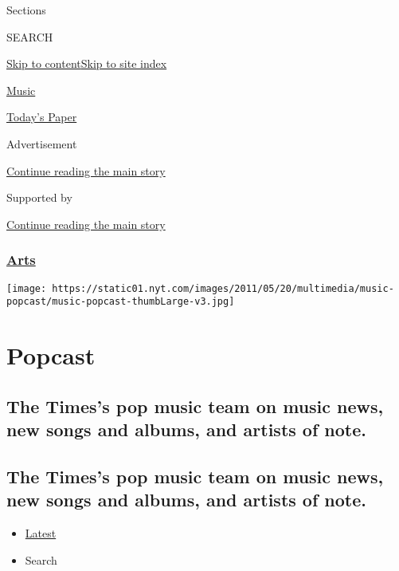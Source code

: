 Sections

SEARCH

\protect\hyperlink{site-content}{Skip to
content}\protect\hyperlink{site-index}{Skip to site index}

\href{https://www.nytimes.com/section/arts/music}{Music}

\href{https://myaccount.nytimes.com/auth/login?response_type=cookie\&client_id=vi}{}

\href{https://www.nytimes.com/section/todayspaper}{Today's Paper}

Advertisement

\protect\hyperlink{after-top}{Continue reading the main story}

Supported by

\protect\hyperlink{after-sponsor}{Continue reading the main story}

\hypertarget{arts}{%
\subsubsection{\texorpdfstring{\href{/section/arts}{Arts}}{Arts}}\label{arts}}

\texttt{[image: https://static01.nyt.com/images/2011/05/20/multimedia/music-popcast/music-popcast-thumbLarge-v3.jpg]}

\hypertarget{popcast}{%
\section{Popcast}\label{popcast}}

\hypertarget{the-timess-pop-music-team-on-music-news-new-songs-and-albums-and-artists-of-note}{%
\subsection{The Times's pop music team on music news, new songs and
albums, and artists of
note.}\label{the-timess-pop-music-team-on-music-news-new-songs-and-albums-and-artists-of-note}}

\hypertarget{the-timess-pop-music-team-on-music-news-new-songs-and-albums-and-artists-of-note-1}{%
\subsection{The Times's pop music team on music news, new songs and
albums, and artists of
note.}\label{the-timess-pop-music-team-on-music-news-new-songs-and-albums-and-artists-of-note-1}}

\begin{itemize}
\tightlist
\item
  \protect\hyperlink{stream-panel}{Latest}
\item
  Search
\end{itemize}

